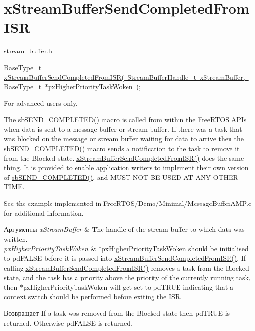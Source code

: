 \hypertarget{group__x_stream_buffer_send_completed_from_i_s_r}{}\section{x\+Stream\+Buffer\+Send\+Completed\+From\+I\+SR}
\label{group__x_stream_buffer_send_completed_from_i_s_r}
\mbox{\hyperlink{stream__buffer_8h}{stream\+\_\+buffer.\+h}}


\begin{DoxyPre}
BaseType\_t \mbox{\hyperlink{stream__buffer_8h_abc37189e4eb8618f5434ae333dd50b23}{xStreamBufferSendCompletedFromISR( StreamBufferHandle\_t xStreamBuffer, BaseType\_t *pxHigherPriorityTaskWoken )}};
\end{DoxyPre}


For advanced users only.

The \mbox{\hyperlink{stream__buffer_8c_aa75273dfbcd92710254df0165ae1da5d}{sb\+S\+E\+N\+D\+\_\+\+C\+O\+M\+P\+L\+E\+T\+E\+D()}} macro is called from within the Free\+R\+T\+OS A\+P\+Is when data is sent to a message buffer or stream buffer. If there was a task that was blocked on the message or stream buffer waiting for data to arrive then the \mbox{\hyperlink{stream__buffer_8c_aa75273dfbcd92710254df0165ae1da5d}{sb\+S\+E\+N\+D\+\_\+\+C\+O\+M\+P\+L\+E\+T\+E\+D()}} macro sends a notification to the task to remove it from the Blocked state. \mbox{\hyperlink{stream__buffer_8h_abc37189e4eb8618f5434ae333dd50b23}{x\+Stream\+Buffer\+Send\+Completed\+From\+I\+S\+R()}} does the same thing. It is provided to enable application writers to implement their own version of \mbox{\hyperlink{stream__buffer_8c_aa75273dfbcd92710254df0165ae1da5d}{sb\+S\+E\+N\+D\+\_\+\+C\+O\+M\+P\+L\+E\+T\+E\+D()}}, and M\+U\+ST N\+OT BE U\+S\+ED AT A\+NY O\+T\+H\+ER T\+I\+ME.

See the example implemented in Free\+R\+T\+O\+S/\+Demo/\+Minimal/\+Message\+Buffer\+A\+M\+P.\+c for additional information.


\begin{DoxyParams}{Аргументы}
{\em x\+Stream\+Buffer} & The handle of the stream buffer to which data was written.\\
\hline
{\em px\+Higher\+Priority\+Task\+Woken} & $\ast$px\+Higher\+Priority\+Task\+Woken should be initialised to pd\+F\+A\+L\+SE before it is passed into \mbox{\hyperlink{stream__buffer_8h_abc37189e4eb8618f5434ae333dd50b23}{x\+Stream\+Buffer\+Send\+Completed\+From\+I\+S\+R()}}. If calling \mbox{\hyperlink{stream__buffer_8h_abc37189e4eb8618f5434ae333dd50b23}{x\+Stream\+Buffer\+Send\+Completed\+From\+I\+S\+R()}} removes a task from the Blocked state, and the task has a priority above the priority of the currently running task, then $\ast$px\+Higher\+Priority\+Task\+Woken will get set to pd\+T\+R\+UE indicating that a context switch should be performed before exiting the I\+SR.\\
\hline
\end{DoxyParams}
\begin{DoxyReturn}{Возвращает}
If a task was removed from the Blocked state then pd\+T\+R\+UE is returned. Otherwise pd\+F\+A\+L\+SE is returned. 
\end{DoxyReturn}
